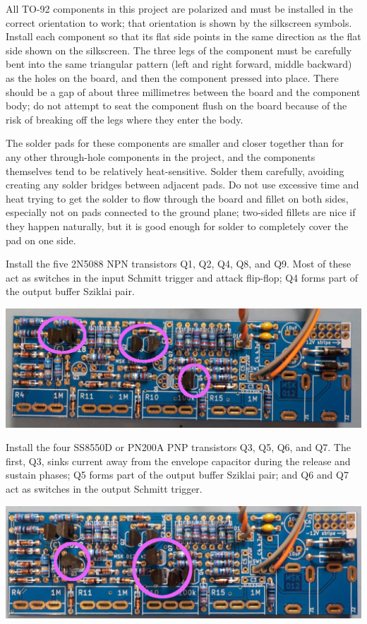 All TO-92 components in this project are polarized and must be installed in
the correct orientation to work; that orientation is shown by the silkscreen
symbols.  Install each component so that its flat side points in the same
direction as the flat side shown on the silkscreen.  The three legs of the
component must be carefully bent into the same triangular pattern (left and
right forward, middle backward) as the holes on the board, and then the
component pressed into place.  There should be a gap of about three
millimetres between the board and the component body; do not attempt to seat
the component flush on the board because of the risk of breaking off the
legs where they enter the body.

The solder pads for these components are smaller and closer together than
for any other through-hole components in the project, and the components
themselves tend to be relatively heat-sensitive.  Solder them carefully,
avoiding creating any solder bridges between adjacent pads.  Do not use
excessive time and heat trying to get the solder to flow through the board
and fillet on both sides, especially not on pads connected to the ground
plane; two-sided fillets are nice if they happen naturally, but it is good
enough for solder to completely cover the pad on one side.

Install the five 2N5088 NPN transistors Q1, Q2, Q4, Q8, and Q9.  Most of
these act as switches in the input Schmitt trigger and attack flip-flop; Q4
forms part of the output buffer Sziklai pair.

\noindent\includegraphics[width=\linewidth]{2n5088.jpg}

Install the four SS8550D or PN200A PNP transistors Q3, Q5, Q6, and Q7.  The
first, Q3, sinks current away from the envelope capacitor during the release
and sustain phases; Q5 forms part of the output buffer Sziklai pair; and Q6
and Q7 act as switches in the output Schmitt trigger.

\noindent\includegraphics[width=\linewidth]{pn200a.jpg}

